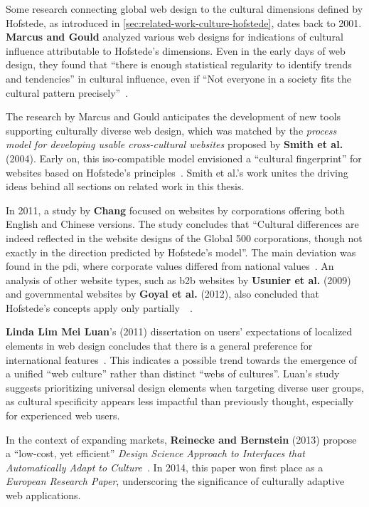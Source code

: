 Some research connecting global web design to the cultural dimensions defined by Hofstede, as introduced in \cref{sec:related-work-culture-hofstede}, dates back to 2001.
\textbf{Marcus and Gould} analyzed various web designs for indications of cultural influence attributable to Hofstede's dimensions.
Even in the early days of web design, they found that ``there is enough statistical regularity to identify trends and tendencies'' in cultural influence, even if ``Not everyone in a society fits the cultural pattern precisely''~\cite{Marcus2010}.

The research by Marcus and Gould anticipates the development of new tools supporting culturally diverse web design, which was matched by the \textit{process model for developing usable cross-cultural websites} proposed by \textbf{Smith et al.} (2004).
Early on, this \ac{iso}-compatible model envisioned a ``cultural fingerprint'' for websites based on Hofstede's principles~\cite{Smith2004}.
Smith et al.'s work unites the driving ideas behind all sections on related work in this thesis.

In 2011, a study by \textbf{Chang} focused on websites by corporations offering both English and Chinese versions.
The study concludes that ``Cultural differences are indeed reflected in the website designs of the Global 500 corporations, though not exactly in the direction predicted by Hofstede's model''.
The main deviation was found in the \acl{pdi}, where corporate values differed from national values~\cite{Chang2011}.
An analysis of other website types, such as \ac{b2b} websites by \textbf{Usunier et al.} (2009) and governmental websites by \textbf{Goyal et al.} (2012), also concluded that Hofstede's concepts apply only partially~\cite{Usunier2009}~\cite{Goyal2012}.

\textbf{Linda Lim Mei Luan}'s (2011) dissertation on users' expectations of localized elements in web design concludes that there is a general preference for international features~\cite{Luan2011}.
This indicates a possible trend towards the emergence of a unified ``web culture'' rather than distinct ``webs of cultures''.
Luan's study suggests prioritizing universal design elements when targeting diverse user groups, as cultural specificity appears less impactful than previously thought, especially for experienced web users.

In the context of expanding markets, \textbf{Reinecke and Bernstein} (2013) propose a ``low-cost, yet efficient'' \textit{Design Science Approach to Interfaces that Automatically Adapt to Culture}~\cite{Reinecke2013}.
In 2014, this paper won first place as a \textit{European Research Paper}, underscoring the significance of culturally adaptive web applications.

